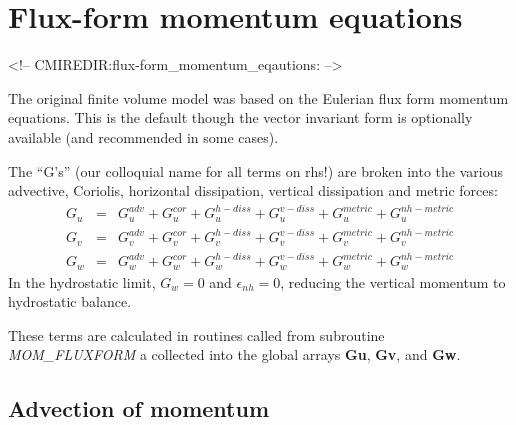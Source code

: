 
\section{Flux-form momentum equations}
\label{sect:flux-form_momentum_equations}
\begin{rawhtml}
<!-- CMIREDIR:flux-form_momentum_eqautions: -->
\end{rawhtml}

The original finite volume model was based on the Eulerian flux form
momentum equations. This is the default though the vector invariant
form is optionally available (and recommended in some cases).

The ``G's'' (our colloquial name for all terms on rhs!) are broken
into the various advective, Coriolis, horizontal dissipation, vertical
dissipation and metric forces:
\begin{eqnarray}
G_u & = & G_u^{adv} + G_u^{cor} + G_u^{h-diss} + G_u^{v-diss} +
G_u^{metric} + G_u^{nh-metric} \label{eq:gsplit_momu} \\
G_v & = & G_v^{adv} + G_v^{cor} + G_v^{h-diss} + G_v^{v-diss} +
G_v^{metric} + G_v^{nh-metric} \label{eq:gsplit_momv} \\
G_w & = & G_w^{adv} + G_w^{cor} + G_w^{h-diss} + G_w^{v-diss} +
G_w^{metric} + G_w^{nh-metric} \label{eq:gsplit_momw}
\end{eqnarray}
In the hydrostatic limit, $G_w=0$ and $\epsilon_{nh}=0$, reducing the
vertical momentum to hydrostatic balance.

These terms are calculated in routines called from subroutine {\em
MOM\_FLUXFORM} a collected into the global arrays {\bf Gu}, {\bf Gv},
and {\bf Gw}.



\subsection{Advection of momentum}

